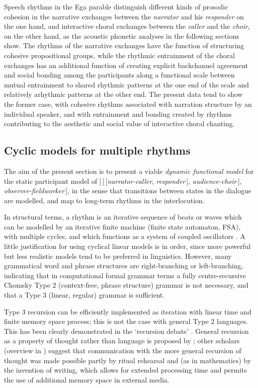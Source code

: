 \documentclass[output=paper,colorlinks,citecolor=brown
]{langscibook}
\begin{document}
Speech rhythms in the Ega parable distinguish different kinds of prosodic cohesion in the narrative exchanges between the \textit{narrator} and his \textit{responder} on the one hand, and interactive choral exchanges between the \textit{caller} and the \textit{choir}, on the other hand, as the acoustic phonetic analyses in the following sections show. The rhythms of the narrative exchanges have the function of structuring cohesive propositional groups, while the rhythmic entrainment of the choral exchanges has an additional function of creating explicit backchannel agreement and social bonding among the participants along a functional scale between mutual entrainment to shared rhythmic patterns at the one end of the scale and relatively arhythmic patterns at the other end. The present data tend to show the former case, with cohesive rhythms associated with narration structure by an individual speaker, and with entrainment and bonding created by rhythms contributing to the aesthetic and social value of interactive choral chanting.

\subsection{Cyclic models for multiple rhythms}

The aim of the present section is to present a viable \textit{dynamic functional model} for the static participant model of [\,[\,[\textit{narrator-caller}, \textit{responder}\,], \textit{audience-choir}\,], \textit{observer-fieldworker}\,], in the sense that transitions between states in the dialogue are modelled, and map to long-term rhythms in the interlocution.

In structural terms, a rhythm is an iterative sequence of beats or waves which can be modelled by an iterative finite machine (finite state automaton, FSA), with multiple cycles, and which functions as a system of coupled oscillators \cite{cumminsport1998, odellnieminen1999, barbosa2002}. A little justification for using cyclical linear models is in order, since more powerful but less realistic models tend to be preferred in linguistics. However, many grammatical word and phrase structures are right-branching or left-branching, indicating that in computational formal grammar terms a fully centre-recursive Chomsky Type 2 (context-free, phrase structure) grammar is not necessary, and that a Type 3 (linear, regular) grammar is sufficient.

Type 3 recursion can be efficiently implemented as iteration with linear time and finite memory space process; this is not the case with general Type 2 languages. This has been clearly demonstrated in the `recursion debate' \cite{karlsson2010}. General recursion as a property of thought rather than language is proposed by \cite{everett2016}; other scholars (overview in \cite{gibbongriffiths2017}) suggest that communication with the more general recursion of thought was made possible partly by ritual rehearsal and (as in mathematics) by the invention of writing, which allows for extended processing time and permits the use of additional memory space in external media.
\end{document}
